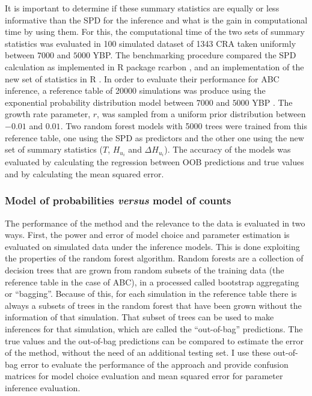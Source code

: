 \documentclass[a4paper]{article}
\begin{document}
It is important to determine if these summary statistics are equally or less informative than the SPD for the inference and what is the gain in computational time by using them. For this, the computational time of the two sets of summary statistics was evaluated in 100 simulated dataset of 1343 CRA taken uniformly between $7000$ and $5000$ YBP. The benchmarking procedure compared the SPD calculation as implemented in {R} package {rcarbon} \parencite{Crema2021a}, and an implementation of the new set of statistics in {R} \parencite{Navascues2023}. In order to evaluate their performance for ABC inference, a reference table of 20000 simulations was produce using the exponential probability distribution model between $7000$ and $5000$ YBP \parencite[\emph{i.e.}\ the same type of model used in the ABC example in][]{Crema2022}. The growth rate parameter, $r$, was sampled from a uniform prior distribution between $-0.01$ and $0.01$. Two random forest models with 5000 trees were trained from this reference table, one using the SPD as predictors and the other one using the new set of summary statistics ($T$, $H_{u_i}$ and $\Delta H_{u_i}$). The accuracy of the models was evaluated by calculating the regression between OOB predictions and true values and by calculating the mean squared error.
\\

\subsubsection*{Model of probabilities \emph{versus} model of counts}

The performance of the method and the relevance to the data is evaluated in two ways. First, the power and error of model choice and parameter estimation is evaluated on simulated data under the inference models. This is done exploiting the properties of the random forest algorithm. Random forests are a collection of decision trees that are grown from random subsets of the training data (the reference table in the case of ABC), in a processed called bootstrap aggregating or ``bagging''. Because of this, for each simulation in the reference table there is always a subsets of trees in the random forest that have been grown without the information of that simulation. That subset of trees can be used to make inferences for that simulation, which are called the ``out-of-bag'' predictions. The true values and the out-of-bag predictions can be compared to estimate the error of the method, without the need of an additional testing set. I use these out-of-bag error to evaluate the performance of the approach and provide confusion matrices for model choice evaluation and mean squared error for parameter inference evaluation.
\\
\end{document}

